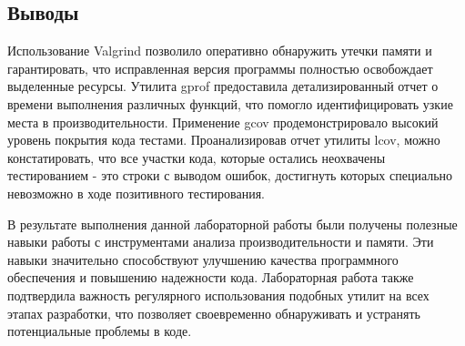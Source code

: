 \documentclass[12pt]{article}
\begin{document}
\subsection*{Выводы}

Использование Valgrind позволило оперативно обнаружить утечки памяти и гарантировать, что исправленная версия программы полностью освобождает выделенные ресурсы. Утилита gprof предоставила детализированный отчет о времени выполнения различных функций, что помогло идентифицировать узкие места в производительности. Применение gcov продемонстрировало высокий уровень покрытия кода тестами. Проанализировав отчет утилиты lcov, можно констатировать, что все участки кода, которые остались неохвачены тестированием - это строки с выводом ошибок, достигнуть которых специально невозможно в ходе позитивного тестирования.

В результате выполнения данной лабораторной работы были получены полезные навыки работы с инструментами анализа производительности и памяти. Эти навыки значительно способствуют улучшению качества программного обеспечения и повышению надежности кода. Лабораторная работа также подтвердила важность регулярного использования подобных утилит на всех этапах разработки, что позволяет своевременно обнаруживать и устранять потенциальные проблемы в коде.
\end{document}
